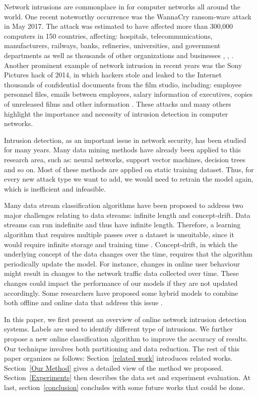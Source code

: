 \documentclass[runningheads]{llncs}
\begin{document}
	Network intrusions are commonplace in for computer networks all around the world. One recent noteworthy occurrence was the WannaCry ransom-ware attack in May 2017. The attack was estimated to have affected more than 300,000 computers in 150 countries, affecting: hospitals, telecommunications, manufacturers, railways, banks, refineries, universities, and government departments as well as thousands of other organizations and businesses \cite{Cameron2017}, \cite{Hern2017}, \cite{Eyerys2017}. Another prominent example of network intrusion in recent years was the Sony Pictures hack of 2014, in which hackers stole and leaked to the Internet thousands of confidential documents from the film studio, including: employee personnel files, emails between employees, salary information of executives, copies of unreleased films and other information \cite{Siboni2014}. These attacks and many others highlight the importance and necessity of intrusion detection in computer networks.
	
	Intrusion detection, as an important issue in network security, has been studied for many years. Many data mining methods have already been applied to this research area, such as: neural networks, support vector machines, decision trees and so on. Most of these methods are applied on static training dataset. Thus, for every new attack type we want to add, we would need to retrain the model again, which is inefficient and infeasible.
	
	Many data stream classification algorithms have been proposed to address two major challenges relating to data streams: infinite length and concept-drift. Data streams can run indefinite and thus have infinite length. Therefore, a learning algorithm that requires multiple passes over a dataset is unsuitable, since it would require infinite storage and training time \cite{Siboni2014}. Concept-drift, in which the underlying concept of the data changes over the time, requires that the algorithm periodically update the model. For instance, changes in online user behaviour might result in changes to the network traffic data collected over time. These changes could impact the performance of our models if they are not updated accordingly. Some researchers have proposed some hybrid models to combine both offline and online data that address this issue \cite{Siboni2014}\cite{Masud2013}. 
	
	In this paper, we first present an overview of online network intrusion detection systems. Labels are used to identify different type of intrusions. We further propose a new online classification algorithm to improve the accuracy of results. Our technique involves both partitioning and data reduction. The rest of this paper organizes as follows: Section~\ref{related work} introduces related works. Section~\ref{Our Method} gives a detailed view of the method we proposed. Section~\ref{Experiments} then describes the data set and experiment evaluation. At last, section~\ref{conclusion} concludes with some future works that could be done.
	
\end{document}
